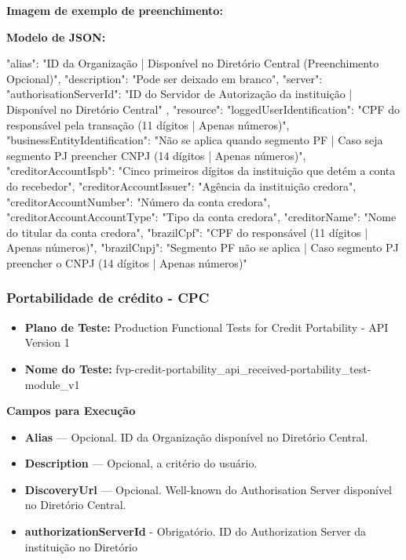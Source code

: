 \textbf{Imagem de exemplo de preenchimento:}

\begin{figure}[H]
    \centering
    \label{fig:enrollments}
\end{figure}

\textbf{Modelo de JSON:}

\begin{codeblock}
{
    "alias": "ID da Organização | Disponível no Diretório Central (Preenchimento Opcional)",
    "description": "Pode ser deixado em branco",
    "server": {
        "authorisationServerId": "ID do Servidor de Autorização da instituição | Disponível no Diretório Central"
    },
    "resource": {
        "loggedUserIdentification": "CPF do responsável pela transação (11 dígitos | Apenas números)",
        "businessEntityIdentification": "Não se aplica quando segmento PF | Caso seja segmento PJ preencher CNPJ (14 dígitos | Apenas números)",
        "creditorAccountIspb": "Cinco primeiros dígitos da instituição que detém a conta do recebedor",
        "creditorAccountIssuer": "Agência da instituição credora",
        "creditorAccountNumber": "Número da conta credora",
        "creditorAccountAccountType": "Tipo da conta credora",
        "creditorName": "Nome do titular da conta credora",
        "brazilCpf": "CPF do responsável (11 dígitos | Apenas números)",
        "brazilCnpj": "Segmento PF não se aplica | Caso segmento PJ preencher o CNPJ (14 dígitos | Apenas números)"
    }
}
\end{codeblock}

\subsubsection{Portabilidade de crédito - CPC}

\begin{itemize}
    \item \textbf{Plano de Teste:} Production Functional Tests for Credit Portability - API Version 1
    \item \textbf{Nome do Teste:} fvp-credit-portability\_api\_received-portability\_test-module\_v1
\end{itemize}

\textbf{Campos para Execução}

\begin{itemize}
    \item \textbf{Alias} — Opcional. ID da Organização disponível no Diretório Central.
    \item \textbf{Description} — Opcional, a critério do usuário.
    \item \textbf{DiscoveryUrl} — Opcional. Well-known do Authorisation Server disponível no Diretório 
    Central.
    \item \textbf{\textcolor{red!80}{authorizationServerId}} - Obrigatório. ID do Authorization Server da instituição no Diretório
\end{itemize}

